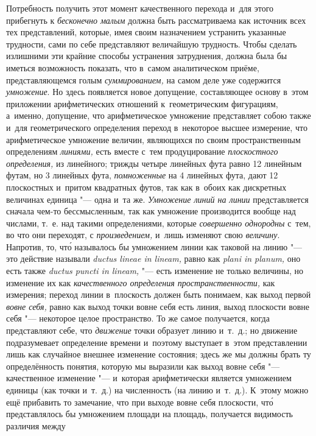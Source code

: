 Потребность получить этот момент качественного перехода и~для этого прибегнуть
к {\em бесконечно малым} должна быть рассматриваема как источник всех тех
представлений, которые, имея своим назначением устранить указанные трудности,
сами по себе представляют величайшую трудность. Чтобы сделать излишними эти
крайние способы устранения затруднения, должна была бы иметься возможность
показать, что в~самом аналитическом приёме, представляющемся голым
{\em суммированием,} на самом деле уже содержится {\em умножение}. Но здесь
появляется новое допущение, составляющее основу в~этом приложении
арифметических отношений к~геометрическим фигурациям, а~именно, допущение, что
арифметическое умножение представляет собою также и~для геометрического
определения переход в~некоторое высшее измерение, что арифметическое умножение
величин, являющихся по своим пространственным определениям {\em линиями,} есть
вместе с~тем продуцирование {\em плоскостного определения,} из линейного;
трижды четыре линейных фута равно 12 линейным футам, но 3 линейных фута,
{\em помноженные} на 4 линейных фута, дают 12 плоскостных и~притом квадратных
футов, так как в~обоих как дискретных величинах единица "--- одна и~та же.
{\em Умножение линий на линии} представляется сначала чем-то бессмысленным, так
как умножение производится вообще над числами, т.~е. над такими определениями,
которые {\em совершенно однородны} с~тем, во что они переходят, с
{\em произведением,} и~лишь изменяют свою {\em величину}. Напротив, то, чт\'{о}
называлось бы умножением линии как таковой на линию "--- это действие называли
{\em ductus lineae in lineam,} равно как {\em plani in planum,} оно есть также
{\em ductus puncti in lineam,} "--- есть изменение не только величины, но
изменение их как {\em качественного определения пространственности,} как
измерения; переход линии в~плоскость должен быть понимаем, как выход первой
{\em вовне себя,} равно как выход точки вовне себя есть линия, выход плоскости
вовне себя "--- некоторое целое пространство. То же самое получается, когда
представляют себе, что {\em движение} точки образует линию и~т.~д.; но движение
подразумевает определение времени и~поэтому выступает в~этом представлении лишь
как случайное внешнее изменение состояния; здесь же мы должны брать ту
определённость понятия, которую мы выразили как выход вовне себя "---
качественное изменение "--- и~которая арифметически является умножением единицы
(как точки и~т.~д.) на численность (на линию и~т.~д.). К~этому можно ещё
прибавить то замечание, что при выходе вовне себя плоскости, чт\'{о} представлялось
бы умножением площади на площадь, получается видимость различия между
